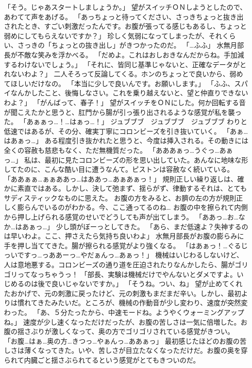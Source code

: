 「そう。じゃあスタートしましょうか。」
望がスイッチＯＮしようとしたので、あわてて声をあげる。
「あっちょっと待ってください、さっきちょっと抜き出されたとき、すごい刺激だったんです。お腹が張ってる感じもあるし、ちょっと弱めにしてもらえないですか？」
珍しく気弱になってしまったが、それくらい、さっきの「ちょっとの抜き出し」がきつかったのだ。
「…ふふ」
水無月部長が不敵な笑みを浮かべる。
「だめよ。これはおしおきなんだからね。手加減するわけないでしょう。」
「それに、皆同じ基準じゃないと、正確なデータがとれないわよ？」
二人そろって反論してくる。ホンのちょっとで良いから、弱めてほしいだけなの。
「本当に少しで良いんです。お願いします。」
「ふふ、スパイなんかしたこと、後悔しなさい。これを乗り越えないと、望と仲直りできないわよ？」
「がんばって、春子！」
望がスイッチをＯＮにした。何か回転する音が聞こえたかと思うと、肛門から腸が引っ張り出されるような感覚が私を襲った。
「あぁぁっ…！…はぁっ…！」
ジュブブブ　ジュブブブ　ジュブブブ
わりと低速ではあるが、その分、確実丁寧にコロンビーズを引き抜いていく。
「あぁ…はあぁっ…」
ある程度引き抜かれたと思うと、今度は挿入される。その動きには全くの容赦も慈悲もなく、ただ無機質だった。
「あああぁっ…うぐっ…あぁっ…」
私は、最初に見たコロンビーズの形を思い出していた。あんなに地味な形してたのに、こんな酷い目に遭うなんて。ピストンは容赦なく続いている。
「ああぁぁ…ぁぁああっ…はああっ…あぁあぁっ！」
規則正しい繰り返しは、確かに素直ではある。しかし、決して弛まず、揺らがず、律動するそれは、とてもサディスティックなものに思えた。
お腹の方をみると、お臍の左の方が規則正しく膨らんでいるのがわかる。今、ここ通ってるのね…
お腹の中を擦られて内側から押し上げられる感覚のせいでどうしても声が出てしまう。
「ああっ…お…なか…はあぁっ…」
少し頭がぼーっとしてきた。
「あら、まだ低速よ？失神するのは早いわよ。ここ、押さえたら気持ち良いわよ」
水無月部長がお腹の膨らみに手を押し当ててきた。腸が擦られる感覚がより強くなる。
「はあぁっ！…ぐるじっいですっ…っああーっ…やだぁんっ…あぁっ！」
機械はいじわるしないけど、人は意地悪する。コロンビーズの通り道を圧迫されたりなんかしたら、腸がゴリゴリってなっちゃうっ！
「部長、実験は機械だけでやんないとダメですよ。いじめるのは後で良いじゃないですか。」
「そうね。つい、ね」
望が止めてくれたおかげで、元の刺激に戻ったけど、元の刺激もまだまだ辛い。しかし、最初よりは慣れてきたみたいだ。ところが、機械の作動音が少し変わり、速度が突然変わった。
「あ、５分たったから、中速モードね。ようやくウォーミングアップね。」
速度が少し速くなっただけだったが、お腹の苦しさは一気に倍増した。お腹の揺さぶりが激しくなって、奥の方でゴリゴリされている感覚がきつい。
「お腹…はぁ…奥の方…きつっ…やぁんっ…ああぁっ」
最初感じたほどのお腹の苦しさは薄くなってきた。いや、苦しさが目立たなくなっただけだ。お腹の奥を穿られて内臓ごと揺さぶられてるという感覚がとてもきついのだ。
